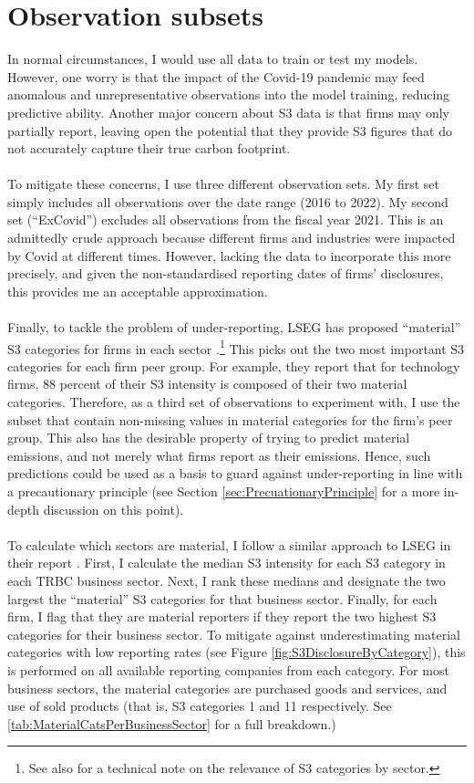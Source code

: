 \documentclass[12pt,twoside]{report}
\begin{document}
\section{Observation subsets}\label{sec:ChoosingObsSet}

In normal circumstances, I would use all data to train or test my models. However, one worry is that the impact of the Covid-19 pandemic may feed anomalous and unrepresentative observations into the model training, reducing predictive ability. Another major concern about S3 data is that firms may only partially report, leaving open the potential that they provide S3 figures that do not accurately capture their true carbon footprint.
\\\\
To mitigate these concerns, I use three different observation sets. My first set simply includes all observations over the date range (2016 to 2022). My second set (``ExCovid'') excludes all observations from the fiscal year 2021. This is an admittedly crude approach because different firms and industries were impacted by Covid at different times. However, lacking the data to incorporate this more precisely, and given the non-standardised reporting dates of firms' disclosures, this provides me an acceptable approximation. 
\\\\
Finally, to tackle the problem of under-reporting, LSEG has proposed ``material'' S3 categories for firms in each sector \cite{ftserussell2024}.\footnote{See also \cite{CDPTechnicalNote2023} for a technical note on the relevance of S3 categories by sector.} This picks out the two most important S3 categories for each firm peer group. For example, they report that for technology firms, 88 percent of their S3 intensity is composed of their two material categories. Therefore, as a third set of observations to experiment with, I use the subset that contain non-missing values in material categories for the firm's peer group. This also has the desirable property of trying to predict material emissions, and not merely what firms report as their emissions. Hence, such predictions could be used as a basis to guard against under-reporting in line with a precautionary principle (see Section \ref{sec:PrecuationaryPrinciple} for a more in-depth discussion on this point). 
\\\\
To calculate which sectors are material, I follow a similar approach to LSEG in their report \cite{ftserussell2024}. First, I calculate the median S3 intensity for each S3 category in each TRBC business sector. Next, I rank these medians and designate the two largest the ``material'' S3 categories for that business sector. Finally, for each firm, I flag that they are material reporters if they report the two highest S3 categories for their business sector. To mitigate against underestimating material categories with low reporting rates (see Figure \ref{fig:S3DisclosureByCategory}), this is performed on all available reporting companies from each category. For most business sectors, the material categories are purchased goods and services, and use of sold products (that is, S3 categories 1 and 11 respectively. See \ref{tab:MaterialCatsPerBusinessSector} for a full breakdown.)
\end{document}
